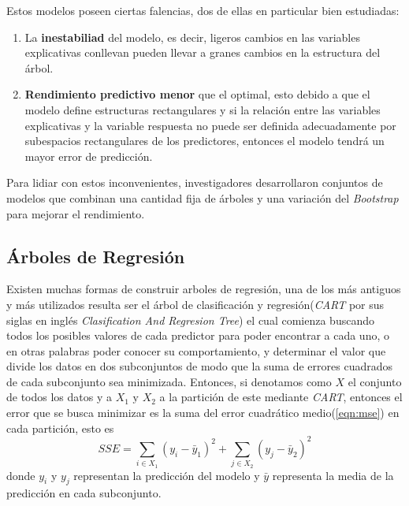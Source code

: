 Estos modelos poseen ciertas falencias, dos de ellas en particular bien estudiadas:
\begin{enumerate}
    \item La \textbf{inestabiliad} del modelo, es decir, ligeros cambios en las variables explicativas conllevan
          pueden llevar a granes cambios en la estructura del árbol.
    \item \textbf{Rendimiento predictivo menor} que el optimal, esto debido a que el modelo define estructuras rectangulares y si 
          la relación entre las variables explicativas y la variable respuesta no puede ser definida adecuadamente por
          subespacios rectangulares de los predictores, entonces el modelo tendrá un mayor error de predicción.
\end{enumerate} 


Para lidiar con estos inconvenientes, investigadores desarrollaron conjuntos de modelos que combinan una cantidad fija de árboles
y una variación del \textit{Bootstrap} para mejorar el rendimiento.

    \subsection{Árboles de Regresión}
    Existen muchas formas de construir arboles de regresión, una de los más antiguos y más utilizados
    resulta ser el árbol de clasificación y regresión(\textit{CART} por sus siglas en inglés 
    \textit{Clasification And Regresion Tree}) el cual comienza buscando todos los posibles valores de cada predictor para poder encontrar a cada uno,
    o en otras palabras poder conocer su comportamiento, y determinar el valor que divide los datos en dos subconjuntos de modo que la suma de errores 
    cuadrados de cada subconjunto sea minimizada\cite{18}. Entonces, si denotamos como $X$ el conjunto de todos los datos y a $X_1 \text{ y } X_2$ a la
    partición de este mediante \textit{CART}, entonces el error que se busca minimizar es la suma del error cuadrático medio(\ref{eqn:mse}) en cada partición, esto es
    \begin{equation*} 
        SSE = \sum_{i\in X_1}(y_i-\bar{y}_1)^2+ \sum_{j\in X_2}(y_j-\bar{y}_2)^2
    \end{equation*}
    donde $y_i$ y $y_j$ representan la predicción del modelo y $\bar{y}$ representa la media de la predicción en cada subconjunto.

